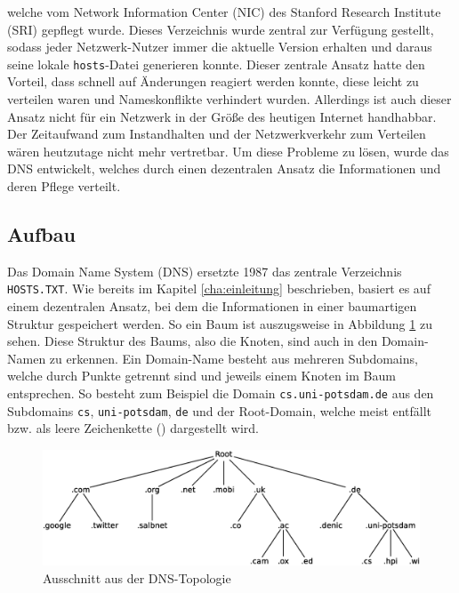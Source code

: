 \documentclass[a4paper, 12pt, BCOR10mm, DIV12, toc=bibliography, toc=listof, german]{scrbook}
\def \dns {Domain Name System (DNS)}
\begin{document}
			welche vom Network Information Center (NIC) des Stanford Research Institute (SRI) gepflegt
			wurde. Dieses Verzeichnis wurde zentral zur Verfügung gestellt, sodass jeder Netzwerk-Nutzer
			immer die aktuelle Version erhalten und daraus seine lokale \texttt{hosts}-Datei generieren
			konnte.  Dieser zentrale Ansatz hatte den Vorteil, dass schnell auf Änderungen reagiert werden
			konnte, diese leicht zu verteilen waren und Nameskonflikte verhindert wurden.  Allerdings ist
			auch dieser Ansatz nicht für ein Netzwerk in der Größe des heutigen Internet handhabbar.  Der
			Zeitaufwand zum Instandhalten und der Netzwerkverkehr zum Verteilen wären heutzutage nicht
			mehr vertretbar. Um diese Probleme zu lösen, wurde das DNS \cite{rfc1034} entwickelt, welches
			durch einen dezentralen Ansatz die Informationen und deren Pflege verteilt.

			


			\subsection{Aufbau} %
			\label{sub:aufbau}

			Das \dns{} ersetzte 1987 das zentrale Verzeichnis \texttt{HOSTS.TXT}. Wie bereits im Kapitel
			\ref{cha:einleitung} beschrieben, basiert es auf einem dezentralen Ansatz, bei dem die
			Informationen in einer baumartigen Struktur gespeichert werden. So ein Baum ist auszugsweise
			in Abbildung \ref{fig:dns-tree} zu sehen. Diese Struktur des Baums, also die Knoten, sind auch
			in den Domain-Namen zu erkennen. Ein Domain-Name besteht aus mehreren Subdomains, welche durch
			Punkte getrennt sind und jeweils einem Knoten im Baum entsprechen. So besteht zum Beispiel die
			Domain \texttt{cs.uni-potsdam.de} aus den Subdomains \texttt{cs}, \texttt{uni-potsdam},
			\texttt{de} und der Root-Domain, welche meist entfällt bzw. als leere Zeichenkette
			(\glqq{}\grqq{}) dargestellt wird.

			\begin{figure}
				\centering
				\includegraphics[width=\textwidth]{images/dns-tree-domains}
				\caption{Ausschnitt aus der DNS-Topologie} %
				\label{fig:dns-tree}
			\end{figure}
\end{document}
